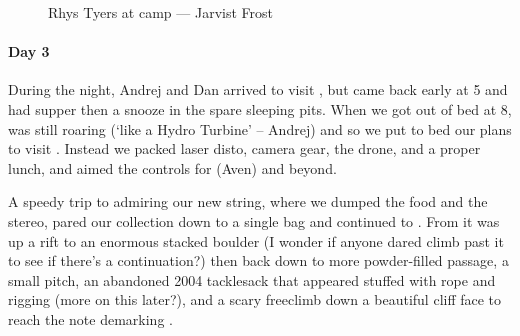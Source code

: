 \begin{figure}[t!]
\checkoddpage \ifoddpage \forcerectofloat \else \forceversofloat \fi
\centering
{}
\caption{Rhys Tyers at \protect{} camp --- Jarvist Frost}
\label{rhys red cow}
\end{figure}


\paragraph{Day 3}
During the night, Andrej and Dan arrived to visit , but came back early at 5 and had supper then a snooze in the spare sleeping pits. When we got out of bed at 8,  was still roaring (`like a Hydro Turbine' -- Andrej) and so we put to bed our plans to visit . Instead we packed laser disto, camera gear, the drone, and a proper lunch, and aimed the controls for  (Aven) and beyond.

A speedy trip to  admiring our new string, where we dumped the food and the stereo, pared our collection down to a single bag and continued to .
From  it was up a rift to an enormous stacked boulder (I wonder if anyone dared climb past it to see if there's a continuation?) then back down to more powder-filled passage, a small pitch, an abandoned 2004 tacklesack that appeared stuffed with rope and rigging (more on this later?), and a scary freeclimb down a beautiful cliff face to reach the note demarking .

